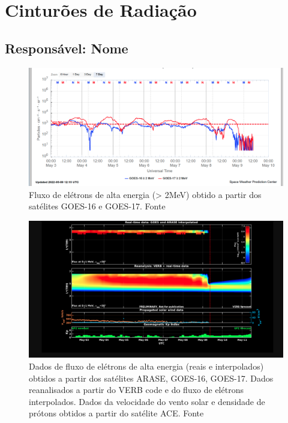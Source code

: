 \documentclass[a4paper, 10pt]{article}
\begin{document}
\section{Cinturões de Radiação} 
 \subsection{Responsável: Nome} 
 
\begin{figure}[H]
    
                        \centering
   
                             \includegraphics[width=14cm]{./figures//figureRadBelts_0.png}

                             \caption{ Fluxo de elétrons de alta energia (> 2MeV) obtido a partir dos satélites GOES-16 e GOES-17. Fonte}
                        \end{figure}

                     \begin{figure}[H]
    
                        \centering
   
                             \includegraphics[width=14cm]{./figures//figureRadBelts_1.png}

                             \caption{ Dados de fluxo de elétrons de alta energia (reais e interpolados) obtidos a partir dos satélites ARASE, GOES-16, GOES-17. Dados reanalisados a partir do VERB code e do fluxo de elétrons interpolados. Dados da velocidade do vento solar e densidade de prótons obtidos a partir do satélite ACE. Fonte}
                        \end{figure}
\end{document}
